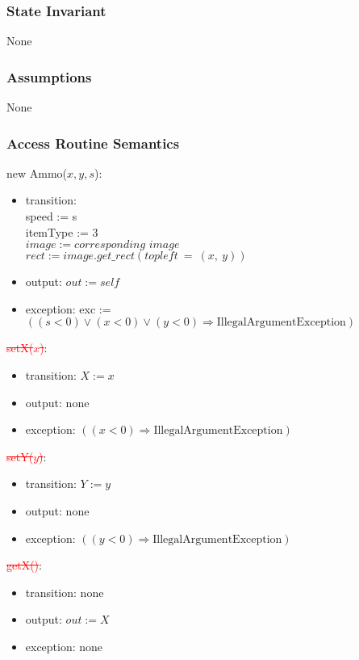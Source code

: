 \documentclass[12pt]{article}
\begin{document}
\subsubsection*{State Invariant}
None
\subsubsection*{Assumptions}
None
\subsubsection*{Access Routine Semantics}
\noindent new Ammo($\mathit{x}, \mathit{y}, \mathit{s}$):
\begin{itemize}
\item transition: \\ speed := s\\ itemType := 3\\$image := \textit{corresponding image}$\\
 $rect := image.get\_rect(topleft\ =\ (x,\ y))$
\item output: $out := \mathit{self}$
\item exception: exc := $((\mathit{s} < 0) \vee (\mathit{x} < 0) \vee 
  (\mathit{y} < 0) \Rightarrow \text{IllegalArgumentException})$
\end{itemize}

\noindent \textcolor{red}{\st{setX($\mathit{x}$)}}:
\begin{itemize}
\item transition: $X := x$ 
\item output: none
\item exception: $((\mathit{x} < 0) \Rightarrow \text{IllegalArgumentException})$
\end{itemize}

\noindent \textcolor{red}{\st{setY($\mathit{y}$)}}:
\begin{itemize}
\item transition: $Y := y$ 
\item output: none
\item exception: $((\mathit{y} < 0) \Rightarrow \text{IllegalArgumentException})$
\end{itemize}

\noindent \textcolor{red}{\st{getX()}}:
\begin{itemize}
\item transition: none
\item output: $out := X$
\item exception: none
\end{itemize}
\end{document}
